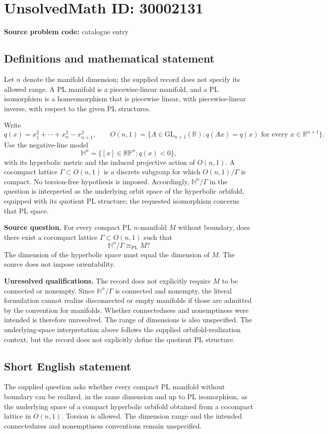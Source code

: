 \documentclass[11pt]{article}
\newcommand{\R}{\mathbb{R}}
\begin{document}
\section*{UnsolvedMath ID: 30002131}
\textbf{Source problem code:} catalogue entry
\subsection{Definitions and mathematical statement}
Let \(n\) denote the manifold dimension; the supplied record does not specify its allowed range. A PL manifold is a piecewise-linear manifold, and a PL isomorphism is a homeomorphism that is piecewise linear, with piecewise-linear inverse, with respect to the given PL structures.

Write
\[
q(x)=x_1^2+\cdots+x_n^2-x_{n+1}^2,
\qquad
O(n,1)=\{A\in\mathrm{GL}_{n+1}(\R):q(Ax)=q(x)\text{ for every }x\in\R^{n+1}\}.
\]
Use the negative-line model
\[
\mathbb H^n=\{[x]\in\mathbb{RP}^{n}:q(x)<0\},
\]
with its hyperbolic metric and the induced projective action of \(O(n,1)\). A cocompact lattice \(\Gamma\subset O(n,1)\) is a discrete subgroup for which \(O(n,1)/\Gamma\) is compact. No torsion-free hypothesis is imposed. Accordingly, \(\mathbb H^n/\Gamma\) in the question is interpreted as the underlying orbit space of the hyperbolic orbifold, equipped with its quotient PL structure; the requested isomorphism concerns that PL space.

\textbf{Source question.} For every compact PL \(n\)-manifold \(M\) without boundary, does there exist a cocompact lattice \(\Gamma\subset O(n,1)\) such that
\[
\mathbb H^n/\Gamma\cong_{\mathrm{PL}}M?
\]
The dimension of the hyperbolic space must equal the dimension of \(M\). The source does not impose orientability.

\textbf{Unresolved qualifications.} The record does not explicitly require \(M\) to be connected or nonempty. Since \(\mathbb H^n/\Gamma\) is connected and nonempty, the literal formulation cannot realize disconnected or empty manifolds if those are admitted by the convention for manifolds. Whether connectedness and nonemptiness were intended is therefore unresolved. The range of dimensions is also unspecified. The underlying-space interpretation above follows the supplied orbifold-realization context, but the record does not explicitly define the quotient PL structure.
\subsection{Short English statement}
The supplied question asks whether every compact PL manifold without boundary can be realized, in the same dimension and up to PL isomorphism, as the underlying space of a compact hyperbolic orbifold obtained from a cocompact lattice in \(O(n,1)\). Torsion is allowed. The dimension range and the intended connectedness and nonemptiness conventions remain unspecified.
\end{document}
